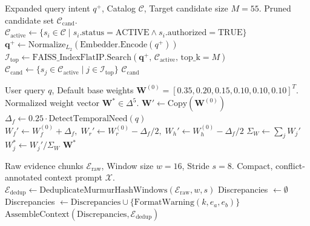\documentclass[journal,10pt,twocolumn]{IEEEtran}
\begin{document}
\begin{algorithm}[h]
\caption{Two-Stage Scalable Vector Pre-filtering Funnel}
\label{alg:funnel}
\begin{algorithmic}[1]
\REQUIRE Expanded query intent $q^+$, Catalog $\mathcal{C}$, Target candidate size $M = 55$.
\ENSURE Pruned candidate set $\mathcal{C}_{\text{cand}}$.
\STATE $\mathcal{C}_{\text{active}} \leftarrow \{s_i \in \mathcal{C} \mid s_i.\text{status} = \text{ACTIVE} \land s_i.\text{authorized} = \text{TRUE}\}$
\STATE $\mathbf{q}^+ \leftarrow \text{Normalize}_{L_2}(\text{Embedder}.\text{Encode}(q^+))$
\STATE $\mathcal{I}_{\text{top}} \leftarrow \text{FAISS\_IndexFlatIP}.\text{Search}(\mathbf{q}^+, \, \mathcal{C}_{\text{active}}, \, \text{top\_k} = M)$
\STATE $\mathcal{C}_{\text{cand}} \leftarrow \{s_j \in \mathcal{C}_{\text{active}} \mid j \in \mathcal{I}_{\text{top}}\}$
\RETURN $\mathcal{C}_{\text{cand}}$
\end{algorithmic}
\end{algorithm}

\begin{algorithm}[h]
\caption{Dynamic Query-Aware Weight Normalization}
\label{alg:dynamic_weights}
\begin{algorithmic}[1]
\REQUIRE User query $q$, Default base weights $\mathbf{W}^{(0)} = [0.35, 0.20, 0.15, 0.10, 0.10, 0.10]^T$.
\ENSURE Normalized weight vector $\mathbf{W}^* \in \Delta^5$.
\STATE $\mathbf{W}' \leftarrow \text{Copy}(\mathbf{W}^{(0)})$
    \STATE $\Delta_f \leftarrow 0.25 \cdot \text{DetectTemporalNeed}(q)$
    \STATE $W_f' \leftarrow W_f^{(0)} + \Delta_f, \; W_r' \leftarrow W_r^{(0)} - \Delta_f / 2, \; W_h' \leftarrow W_h^{(0)} - \Delta_f / 2$
\ENDIF
\STATE $\Sigma_W \leftarrow \sum_{j} W_j'$
    \STATE $W_j^* \leftarrow W_j' / \Sigma_W$
\ENDFOR
\RETURN $\mathbf{W}^*$
\end{algorithmic}
\end{algorithm}

\begin{algorithm}[h]
\caption{Multi-Source Evidence Fusion and Conflict Mitigation}
\label{alg:evidence_fusion}
\begin{algorithmic}[1]
\REQUIRE Raw evidence chunks $\mathcal{E}_{\text{raw}}$, Window size $w = 16$, Stride $s = 8$.
\ENSURE Compact, conflict-annotated context prompt $\mathcal{X}$.
\STATE $\mathcal{E}_{\text{dedup}} \leftarrow \text{DeduplicateMurmurHashWindows}(\mathcal{E}_{\text{raw}}, w, s)$
\STATE Discrepancies $\leftarrow \emptyset$
            \STATE Discrepancies $\leftarrow \text{Discrepancies} \cup \{\text{FormatWarning}(k, e_a, e_b)\}$
        \ENDIF
    \ENDFOR
\ENDFOR
\RETURN $\text{AssembleContext}(\text{Discrepancies}, \mathcal{E}_{\text{dedup}})$
\end{algorithmic}
\end{algorithm}
\end{document}
